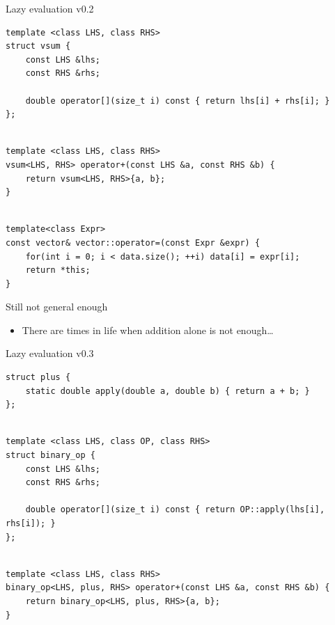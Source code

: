 \documentclass[@BEAMER_OPTIONS@]{beamer}
\begin{document}
\begin{frame}[fragile,shrink=2]{Lazy evaluation v0.2}
    \begin{exampleblock}{}
        \begin{lstlisting}
template <class LHS, class RHS>
struct vsum {
    const LHS &lhs;
    const RHS &rhs;

    double operator[](size_t i) const { return lhs[i] + rhs[i]; }
};
        \end{lstlisting}
        \pause
        \begin{lstlisting}[firstnumber=last]

template <class LHS, class RHS>
vsum<LHS, RHS> operator+(const LHS &a, const RHS &b) {
    return vsum<LHS, RHS>{a, b};
}
        \end{lstlisting}
        \pause
        \begin{lstlisting}[firstnumber=last]

template<class Expr>
const vector& vector::operator=(const Expr &expr) {
    for(int i = 0; i < data.size(); ++i) data[i] = expr[i];
    return *this;
}
        \end{lstlisting}
    \end{exampleblock}
\end{frame}

\note{ }

\begin{frame}{Still not general enough}
    \begin{itemize}
        \item There are times in life when addition alone is not enough\ldots
    \end{itemize}
\end{frame}

\note{ }

\begin{frame}[fragile]{Lazy evaluation v0.3}
    \begin{exampleblock}{}
        \begin{lstlisting}
struct plus {
    static double apply(double a, double b) { return a + b; }
};
        \end{lstlisting}
        \pause
        \begin{lstlisting}[firstnumber=last]

template <class LHS, class OP, class RHS>
struct binary_op {
    const LHS &lhs;
    const RHS &rhs;

    double operator[](size_t i) const { return OP::apply(lhs[i], rhs[i]); }
};
        \end{lstlisting}
        \pause
        \begin{lstlisting}[firstnumber=last]

template <class LHS, class RHS>
binary_op<LHS, plus, RHS> operator+(const LHS &a, const RHS &b) {
    return binary_op<LHS, plus, RHS>{a, b};
}
        \end{lstlisting}
    \end{exampleblock}
\end{frame}
\end{document}
